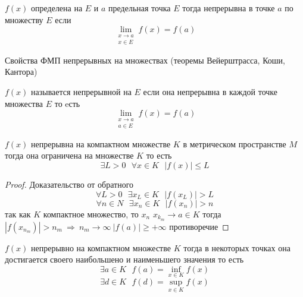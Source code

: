 \begin{define}
  $f(x)$ определена на $E$ и $a$ предельная точка $E$ тогда непрерывна в точке
  $a$ по множеству $E$ если
  $$
  \lim_{\substack{x \to a \\ x \in E}} f(x) = f(a)
  $$
\end{define}

\begin{title}[\Large]
  Свойства ФМП непрерывных на множествах (теоремы Вейерштрасса, Коши, Кантора)
\end{title}

\begin{define}
  $f(x)$ называется непрерывной на $E$ если она непрерывна в каждой точке
  множества $E$ то eсть
  $$
  \lim_{\substack{x \to a \\ a \in E}} f(x) = f(a)
  $$
\end{define}

\begin{theorem}
  $f(x)$ непрерывна на компактном множестве $K$ в метрическом пространстве
  $M$ тогда она ограничена на множестве $K$ то есть
  $$
  \exists L > 0 ~~~ \forall x \in K ~~~ |f(x)| \le L
  $$
\end{theorem}

\begin{proof}
  Доказательство от обратного
  $$
  \forall L > 0 ~~~ \exists x_L \in K ~~~ |f(x_L)| > L
  $$
  $$
  \forall n \in N ~~~ \exists x_n \in K ~~~ |f(x_n)| > n
  $$
  так как $K$ компактное множество, то $x_n$ $x_{k_m} \to a \in K$ тогда
  $|f(x_{n_m})| > n_m ~ \Rightarrow ~ n_m \to \infty ~ |f(a)| \ge +\infty$
  противоречие
\end{proof}

\begin{theorem}
  $f(x)$ непрерывно на компактном множестве $K$ тогда в некоторых точках она
  достигается своего наибольшено и наименьшего значения то есть
  $$
  \exists a \in K ~~~ f(a) = \inf \limits_{x \in K} f(x)
  $$
  $$
  \exists d \in K ~~~ f(d) = \sup \limits_{x \in K} f(x)
  $$
\end{theorem}

